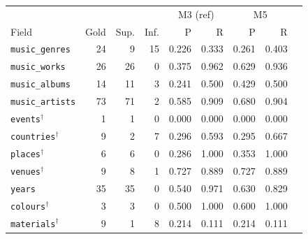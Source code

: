 \begin{tabular}{lrrrrrrrr}
\toprule
\multicolumn{4}{l}{} & \multicolumn{2}{c}{M3 (ref)} & \multicolumn{2}{c}{M5} \\
Field & Gold & Sup. & Inf. & P & R & P & R \\
\midrule
\texttt{music\_genres} & 24 & 9 & 15 & 0.226 & 0.333 & 0.261 & 0.403 \\
\texttt{music\_works} & 26 & 26 & 0 & 0.375 & 0.962 & 0.629 & 0.936 \\
\texttt{music\_albums} & 14 & 11 & 3 & 0.241 & 0.500 & 0.429 & 0.500 \\
\texttt{music\_artists} & 73 & 71 & 2 & 0.585 & 0.909 & 0.680 & 0.904 \\
\texttt{events}$^{\dagger}$ & 1 & 1 & 0 & 0.000 & 0.000 & 0.000 & 0.000 \\
\texttt{countries}$^{\dagger}$ & 9 & 2 & 7 & 0.296 & 0.593 & 0.295 & 0.667 \\
\texttt{places}$^{\dagger}$ & 6 & 6 & 0 & 0.286 & 1.000 & 0.353 & 1.000 \\
\texttt{venues}$^{\dagger}$ & 9 & 8 & 1 & 0.727 & 0.889 & 0.727 & 0.889 \\
\texttt{years} & 35 & 35 & 0 & 0.540 & 0.971 & 0.630 & 0.829 \\
\texttt{colours}$^{\dagger}$ & 3 & 3 & 0 & 0.500 & 1.000 & 0.600 & 1.000 \\
\texttt{materials}$^{\dagger}$ & 9 & 1 & 8 & 0.214 & 0.111 & 0.214 & 0.111 \\
\bottomrule
\end{tabular}
